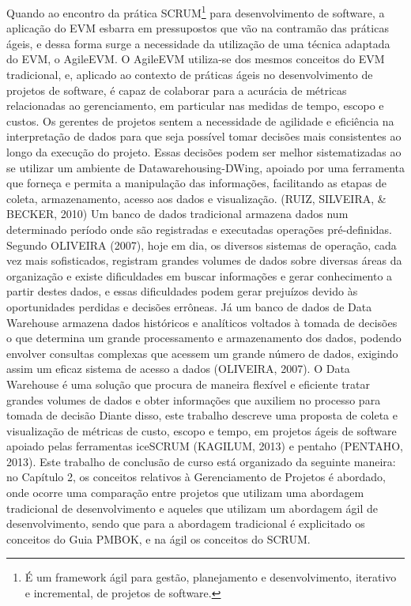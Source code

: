 Quando ao encontro da prática SCRUM\footnote{\color{red}É um framework ágil para gestão, planejamento e desenvolvimento, iterativo e incremental, de projetos de software.} para desenvolvimento de software, a aplicação do EVM esbarra em pressupostos que vão na contramão das práticas ágeis, e dessa forma surge a necessidade da utilização de uma técnica adaptada do EVM, o AgileEVM.
O AgileEVM utiliza-se dos mesmos conceitos do EVM tradicional, e, aplicado ao contexto de práticas ágeis no desenvolvimento de projetos de software, é capaz de colaborar para a acurácia de métricas relacionadas ao gerenciamento, em particular nas medidas de tempo, escopo e custos.
Os gerentes de projetos sentem a necessidade de agilidade e eficiência na interpretação de dados para que seja possível tomar decisões mais consistentes ao longo da execução do projeto. Essas decisões podem ser melhor sistematizadas ao se utilizar um ambiente de Datawarehousing-DWing, apoiado por uma ferramenta que forneça e permita a manipulação das informações, facilitando as etapas de coleta, armazenamento, acesso aos dados e visualização. (RUIZ, SILVEIRA, \& BECKER, 2010)
Um banco de dados tradicional armazena dados num determinado período onde são registradas e executadas operações pré-definidas. Segundo OLIVEIRA (2007), hoje em dia, os diversos sistemas de operação, cada vez mais sofisticados, registram grandes volumes de dados sobre diversas áreas da organização e existe dificuldades em buscar informações e gerar conhecimento a partir destes dados, e essas dificuldades podem gerar prejuízos devido às oportunidades perdidas e decisões errôneas.
Já um banco de dados de Data Warehouse armazena dados históricos e analíticos voltados à tomada de decisões o que determina um grande processamento e armazenamento dos dados, podendo envolver consultas complexas que acessem um grande número de dados, exigindo assim um eficaz sistema de acesso a dados (OLIVEIRA, 2007). O Data Warehouse é uma solução que procura de maneira flexível e eficiente tratar grandes volumes de dados e obter informações que auxiliem no processo para tomada de decisão
Diante disso, este trabalho descreve uma proposta de coleta e visualização de métricas de custo, escopo e tempo, em projetos ágeis de software apoiado pelas ferramentas iceSCRUM (KAGILUM, 2013) e pentaho (PENTAHO, 2013).
Este trabalho de conclusão de curso está organizado da seguinte maneira: no Capítulo 2, os conceitos relativos à Gerenciamento de Projetos é abordado, onde ocorre uma comparação entre projetos que utilizam uma abordagem tradicional de desenvolvimento e aqueles que utilizam um abordagem ágil de desenvolvimento, sendo que para a abordagem tradicional é explicitado os conceitos do Guia PMBOK, e na ágil os conceitos do SCRUM.
